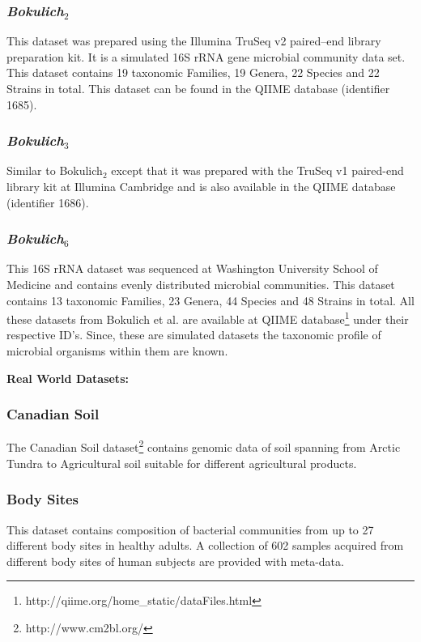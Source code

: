 \documentclass[10pt, conference, compsocconf]{IEEEtran}
\begin{document}
\subsubsection{\textit{Bokulich$_2$}}
This dataset was prepared using the 
Illumina TruSeq v2 paired--end library
preparation kit. It is a simulated 16S rRNA gene 
microbial community data set.
This 
dataset contains 19 taxonomic Families, 19 Genera, 22 Species 
and 22 Strains in total. This dataset can be 
found in the QIIME database (identifier 1685).

\subsubsection{\textit{Bokulich$_3$}}
Similar to Bokulich$_2$ except that it was 
prepared with the 
TruSeq v1 paired-end library kit at 
Illumina Cambridge and is  also available in the 
QIIME database (identifier 1686).

\subsubsection{\textit{Bokulich$_6$}}
This  16S rRNA dataset 
was sequenced at Washington University School of Medicine and 
contains evenly distributed microbial communities. This 
dataset contains 13 taxonomic 
Families, 23 Genera, 44 Species and 48 Strains in total.
%
All these datasets from Bokulich et al.\cite{MARmockDatasetRef} are 
available at QIIME database\footnote{http://qiime.org/home\_static/dataFiles.html} under their respective ID's. Since, these are simulated 
datasets the taxonomic profile of microbial organisms within them 
are known.

\textbf{Real World Datasets:}

\subsubsection{Canadian Soil}
The Canadian Soil dataset\footnote{http://www.cm2bl.org/} contains 
genomic data of soil spanning from Arctic 
Tundra to Agricultural soil suitable for different 
agricultural products.  %

\subsubsection{Body Sites}
This dataset contains composition of 
bacterial communities from up to 27 different 
body sites in healthy adults. A collection of 602 samples acquired from different body sites of human subjects are provided with meta-data.
\end{document}
